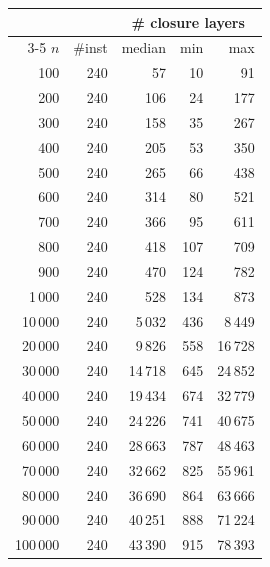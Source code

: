 \begin{tabular}{@{}rrrrr@{}}
\toprule
 &  & \multicolumn{3}{c}{\# closure layers} \\
\cmidrule(l){3-5}
$n$ & \#inst & median & min & max \\
\midrule
100 & 240 & 57 & 10 & 91 \\
200 & 240 & 106 & 24 & 177 \\
300 & 240 & 158 & 35 & 267 \\
400 & 240 & 205 & 53 & 350 \\
500 & 240 & 265 & 66 & 438 \\
600 & 240 & 314 & 80 & 521 \\
700 & 240 & 366 & 95 & 611 \\
800 & 240 & 418 & 107 & 709 \\
900 & 240 & 470 & 124 & 782 \\
1\,000 & 240 & 528 & 134 & 873 \\
10\,000 & 240 & 5\,032 & 436 & 8\,449 \\
20\,000 & 240 & 9\,826 & 558 & 16\,728 \\
30\,000 & 240 & 14\,718 & 645 & 24\,852 \\
40\,000 & 240 & 19\,434 & 674 & 32\,779 \\
50\,000 & 240 & 24\,226 & 741 & 40\,675 \\
60\,000 & 240 & 28\,663 & 787 & 48\,463 \\
70\,000 & 240 & 32\,662 & 825 & 55\,961 \\
80\,000 & 240 & 36\,690 & 864 & 63\,666 \\
90\,000 & 240 & 40\,251 & 888 & 71\,224 \\
100\,000 & 240 & 43\,390 & 915 & 78\,393 \\
\bottomrule
\end{tabular}
